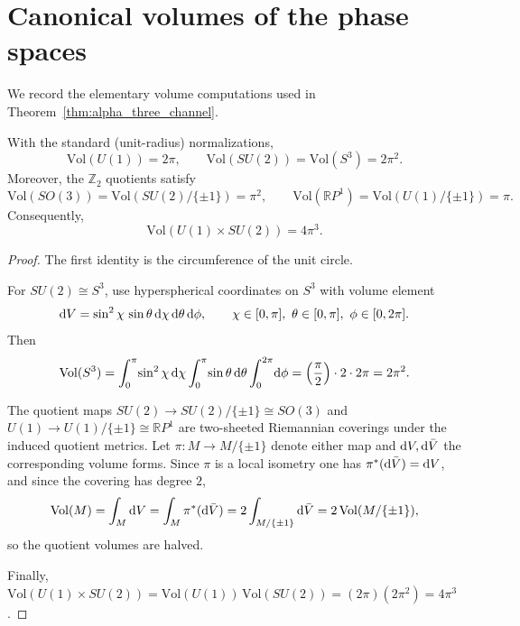 \section{Canonical volumes of the phase spaces}
\label{app:group_volumes}

We record the elementary volume computations used in Theorem~\ref{thm:alpha_three_channel}.

\begin{lemma}
\label{lem:group_volumes}
With the standard (unit-radius) normalizations,
\begin{equation}
\mathrm{Vol}(U(1))=2\pi,\qquad \mathrm{Vol}(SU(2))=\mathrm{Vol}(S^3)=2\pi^2.
\end{equation}
Moreover, the $\mathbb{Z}_2$ quotients satisfy
\begin{equation}
\mathrm{Vol}(SO(3))=\mathrm{Vol}(SU(2)/\{\pm 1\})=\pi^2,\qquad
\mathrm{Vol}(\mathbb{R}P^1)=\mathrm{Vol}(U(1)/\{\pm 1\})=\pi.
\end{equation}
Consequently,
\begin{equation}
\mathrm{Vol}(U(1)\times SU(2))=4\pi^3.
\end{equation}
\end{lemma}

\begin{proof}
The first identity is the circumference of the unit circle.

For $SU(2)\cong S^3$, use hyperspherical coordinates on $S^3$ with volume element
\begin{equation}
\mathrm{d} V=\sin^2\chi\,\sin\theta\,\mathrm{d}\chi\,\mathrm{d}\theta\,\mathrm{d}\phi,
\qquad
\chi\in[0,\pi],\ \theta\in[0,\pi],\ \phi\in[0,2\pi].
\end{equation}
Then
\begin{equation}
\mathrm{Vol}(S^3)=\int_0^{\pi}\!\sin^2\chi\,\mathrm{d}\chi\int_0^{\pi}\!\sin\theta\,\mathrm{d}\theta\int_0^{2\pi}\!\mathrm{d}\phi
=\left(\frac{\pi}{2}\right)\cdot 2\cdot 2\pi = 2\pi^2.
\end{equation}

The quotient maps $SU(2)\to SU(2)/\{\pm 1\}\cong SO(3)$ and $U(1)\to U(1)/\{\pm 1\}\cong \mathbb{R}P^1$ are two-sheeted Riemannian coverings under the induced quotient metrics. Let $\pi:M\to M/\{\pm 1\}$ denote either map and $\mathrm{d} V,\mathrm{d} \bar V$ the corresponding volume forms. Since $\pi$ is a local isometry one has $\pi^\ast(\mathrm{d} \bar V)=\mathrm{d} V$, and since the covering has degree $2$,
\[
\mathrm{Vol}(M)=\int_M \mathrm{d} V=\int_M \pi^\ast(\mathrm{d} \bar V)=2\int_{M/\{\pm 1\}}\mathrm{d} \bar V=2\,\mathrm{Vol}(M/\{\pm 1\}),
\]
so the quotient volumes are halved.

Finally, $\mathrm{Vol}(U(1)\times SU(2))=\mathrm{Vol}(U(1))\,\mathrm{Vol}(SU(2))=(2\pi)(2\pi^2)=4\pi^3$.
\end{proof}
